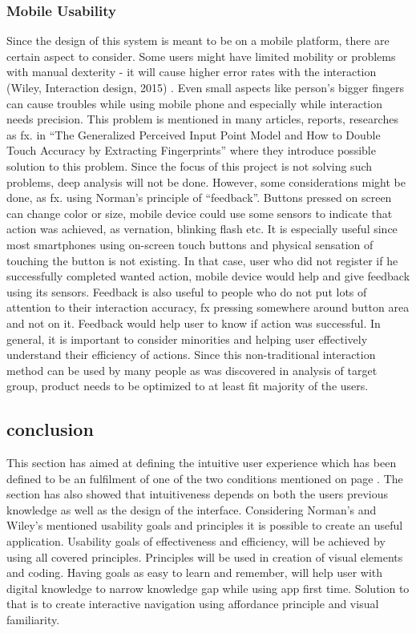 \subsubsection{Mobile Usability}

Since the design of this system is meant to be on a mobile platform, there are 
certain aspect to consider. Some users might have limited mobility or problems 
with manual dexterity - it will cause higher 
error rates with the interaction (Wiley, Interaction design, 2015)
. Even small aspects like person’s bigger fingers can cause 
troubles while using mobile phone and especially while interaction needs 
precision. This problem is mentioned in many articles, reports, researches as fx. 
in “The Generalized Perceived Input Point Model and How to Double Touch Accuracy 
by Extracting Fingerprints” where they introduce possible solution to this 
problem. Since the focus of this project is not solving such problems, deep 
analysis will not be done. However, some considerations might be done, as fx. 
using Norman’s principle of “feedback”. Buttons pressed on screen can change 
color or size, mobile device could use some sensors to indicate that action was 
achieved, as vernation, blinking flash etc. It is especially useful since most 
smartphones using on-screen touch buttons and physical sensation of touching the 
button is not existing.  In that case, user who did not register if he 
successfully completed wanted action, mobile device would help and give feedback 
using its sensors. Feedback is also useful to people who do not put lots of 
attention to their interaction accuracy, fx pressing somewhere around button area 
and not on it. Feedback would help user to know if action was successful. 
In general, it is important to consider minorities and helping user effectively 
understand their efficiency of actions. Since this non-traditional interaction 
method can be used by many people as was discovered in analysis of target group, 
product needs to be optimized to at least fit majority of the users. 

\subsection{conclusion}
This section has aimed at defining the intuitive user experience which has been defined to be an fulfilment of one of the two conditions mentioned on page \pageref{intuitiveConditions}. The section has also showed that intuitiveness depends on both the users previous knowledge as well as the design of the interface. Considering Norman’s and Wiley’s mentioned usability goals and principles it is 
possible to create an useful application. Usability goals of effectiveness and 
efficiency, will be achieved by using all covered principles. Principles will be 
used in creation of visual elements and coding. Having goals as easy to learn and 
remember, will help user with digital knowledge to narrow knowledge gap while 
using app first time. Solution to that is to create interactive navigation using 
affordance principle and visual familiarity.